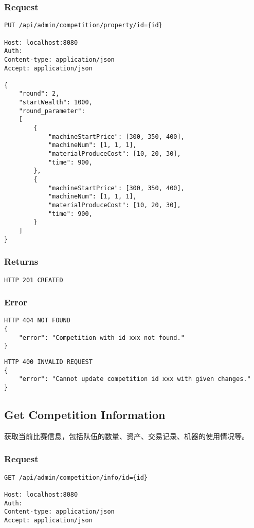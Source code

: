 \documentclass{article}
\begin{document}
\subsubsection*{Request}
\begin{lstlisting}
PUT /api/admin/competition/property/id={id}

Host: localhost:8080
Auth:
Content-type: application/json
Accept: application/json

{
    "round": 2,
    "startWealth": 1000,
    "round_parameter":
    [
        {
            "machineStartPrice": [300, 350, 400],
            "machineNum": [1, 1, 1],
            "materialProduceCost": [10, 20, 30],
            "time": 900,
        },
        {
            "machineStartPrice": [300, 350, 400],
            "machineNum": [1, 1, 1],
            "materialProduceCost": [10, 20, 30],
            "time": 900,
        }
    ]
}
\end{lstlisting}

\subsubsection*{Returns}
\begin{lstlisting}
HTTP 201 CREATED
\end{lstlisting}

\subsubsection*{Error}
\begin{lstlisting}
HTTP 404 NOT FOUND
{
    "error": "Competition with id xxx not found."
}
\end{lstlisting}

\begin{lstlisting}
HTTP 400 INVALID REQUEST
{
    "error": "Cannot update competition id xxx with given changes."
}
\end{lstlisting}

\subsection{Get Competition Information}
获取当前比赛信息，包括队伍的数量、资产、交易记录、机器的使用情况等。

\subsubsection*{Request}
\begin{lstlisting}
GET /api/admin/competition/info/id={id}

Host: localhost:8080
Auth:
Content-type: application/json
Accept: application/json
\end{lstlisting}
\end{document}
